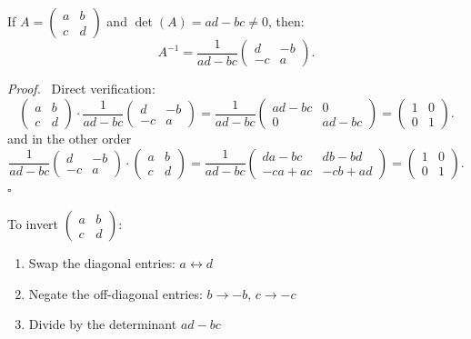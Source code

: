 \documentclass[11pt]{report}
\renewenvironment{proof}[1][Proof]{\par\noindent\textit{#1.}\ }{\hfill$\square$\par\medskip}
\begin{document}
\begin{proposition}
If $A = \begin{pmatrix} a & b \\ c & d \end{pmatrix}$ and $\det(A) = ad - bc \neq 0$, then:
\[
A^{-1} = \frac{1}{ad - bc} \begin{pmatrix} d & -b \\ -c & a \end{pmatrix}.
\]
\end{proposition}

\begin{proof}
Direct verification:
\[
\begin{pmatrix} a & b \\ c & d \end{pmatrix} \cdot \frac{1}{ad-bc} \begin{pmatrix} d & -b \\ -c & a \end{pmatrix} = \frac{1}{ad-bc} \begin{pmatrix} ad - bc & 0 \\ 0 & ad - bc \end{pmatrix} = \begin{pmatrix} 1 & 0 \\ 0 & 1 \end{pmatrix}.
\]
and in the other order
\[
\frac{1}{ad-bc} \begin{pmatrix} d & -b \\ -c & a \end{pmatrix} \cdot \begin{pmatrix} a & b \\ c & d \end{pmatrix} = \frac{1}{ad-bc} \begin{pmatrix} da - bc & db - bd \\ -ca + ac & -cb + ad \end{pmatrix} = \begin{pmatrix} 1 & 0 \\ 0 & 1 \end{pmatrix}.
\]
\end{proof}

\begin{remark}
To invert $\begin{pmatrix} a & b \\ c & d \end{pmatrix}$:
\begin{enumerate}[itemsep=2pt]
    \item Swap the diagonal entries: $a \leftrightarrow d$
    \item Negate the off-diagonal entries: $b \to -b$, $c \to -c$
    \item Divide by the determinant $ad - bc$
\end{enumerate}
\end{remark}
\end{document}
